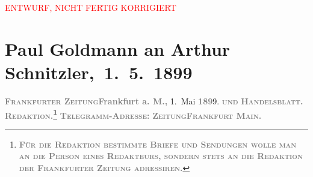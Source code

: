 
\begin{center}
            \textcolor{red}{ENTWURF, NICHT FERTIG KORRIGIERT}
                      \end{center}
            
         
         \renewcommand{\erwaehntePersonen}{Personen: Marie Reinhard}
         \renewcommand{\erwaehnteInstitutionen}{Institutionen: Frankfurter Zeitung}
         \renewcommand{\erwaehnteOrte}{Orte: Berlin, Den Haag, Deutsches Theater Berlin, Frankfurt am Main, Graz, Wien}
         \renewcommand{\erwaehnteWerke}{Werke: Der grüne Kakadu – Paracelsus – Die Gefährtin. Drei Einakter, Der grüne Kakadu. Groteske in einem Akt}
               \section[ Paul Goldmann an Arthur Schnitzler, 1. 5. 1899]{ Paul Goldmann an Arthur Schnitzler, 1. 5. 1899}\nopagebreak{}\rehead{ }\begin{ledgroupsized}[t]{13cm}\normalsize\beginnumbering \toendnotes[C]{\smallbreak\pagebreak[2]} 
\toendnotes[C]{\smallbreak}\pstart
           \noindent{}{\pb}\textcolor{gray}{\textbf{\textsc{Frankfurter Zeitung}}}\hfill \textcolor{gray}{\textbf{Frankfurt a. M.,}}{ }1. Mai \textcolor{gray}{\textbf{189}}9.\pend
           \pstart
           \textsc{\textcolor{gray}{\textbf{und}}}\pend
           \pstart
           \textcolor{gray}{\textbf{\textsc{Handelsblatt.}}}\pend
           \pstart
           \textcolor{gray}{\textbf{\textsc{Redaktion.\footnote{\noindent{}\textcolor{gray}{\textbf{\textsc{Für die Redaktion beſtimmte Briefe und Sendungen
                                    wolle man  an die Perſon eines
                                    Redakteurs, ſondern ſtets \textbf{an die Redaktion der
                                          Frankfurter Zeitung} adreſſiren.}}}}}}}\pend
           \pstart
           \textcolor{gray}{\textbf{\textsc{Telegramm-Adreſſe:}}}\pend
           \pstart
           \textcolor{gray}{\textbf{\textsc{ZeitungFrankfurt Main.}}}\pend

\end{ledgroupsized}
